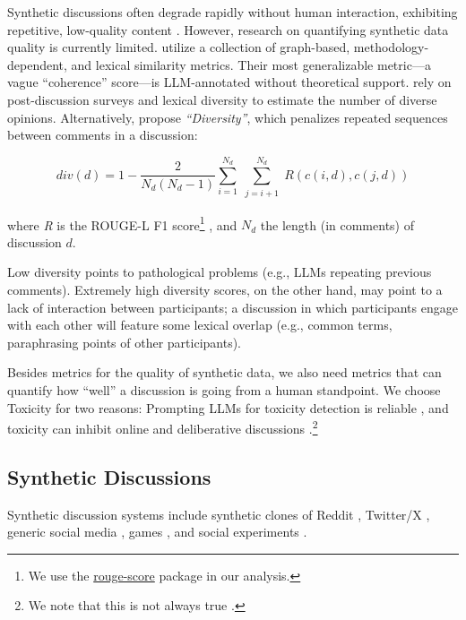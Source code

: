 Synthetic discussions often degrade rapidly without human interaction, exhibiting repetitive, low-quality content \citep{ulmer2024}. However, research on quantifying synthetic data quality is currently limited. \citet{balog_2024} utilize a collection of graph-based, methodology-dependent, and lexical similarity metrics. Their most generalizable metric—a vague “coherence” score—is \ac{LLM}-annotated without theoretical support. \citet{kim_et_al_chatbot} rely on post-discussion surveys and lexical diversity to estimate the number of diverse opinions. Alternatively, \citet{ulmer2024} propose \textit{“Diversity”}, which penalizes repeated sequences between comments in a discussion:

\small
\begin{equation}
\label{eq:variety}
    \textit{div}(d) = 1 - \frac{2}{N_d(N_d-1)}
\sum_{i=1}^{N_d} \sum_{\substack{j=i+1}}^{N_d} R(c(i,d), c(j,d))
\end{equation}
\normalsize

\noindent where \textit{R} is the ROUGE-L F1 score\footnote{We use the \href{https://pypi.org/project/rouge-score}{rouge-score} package in our analysis.} \cite{lin-2004-rouge}, and $N_d$ the length (in comments) of discussion $d$.

Low diversity points to pathological problems (e.g., \acp{LLM} repeating previous comments). Extremely high diversity scores, on the other hand, may point to a lack of interaction between participants; a discussion in which participants engage with each other will feature some lexical overlap (e.g., common terms, paraphrasing points of other participants).

Besides metrics for the quality of synthetic data, we also need metrics that can quantify how ``well'' a discussion is going from a human standpoint. We choose Toxicity for two reasons: Prompting \acp{LLM} for toxicity detection is reliable \citep{kang-qian-2024-implanting, Wang2022ToxicityDW, anjum2024hate}, and toxicity can inhibit online and deliberative discussions \citep{dekock2022disagree, XiaToxicity}.\footnote{We note that this is not always true \citep{Avalle2024PersistentIP}.}


\subsection{Synthetic Discussions}
\label{ssec:related:discussions}

Synthetic discussion systems include synthetic clones of Reddit \cite{park_simulacra}, Twitter/X \cite{mou_2024}, generic social media \cite{tornberg_2023, y_social}, games \cite{Park2023GenerativeAI}, and social experiments \cite{zhou_2024_sotopia}.

